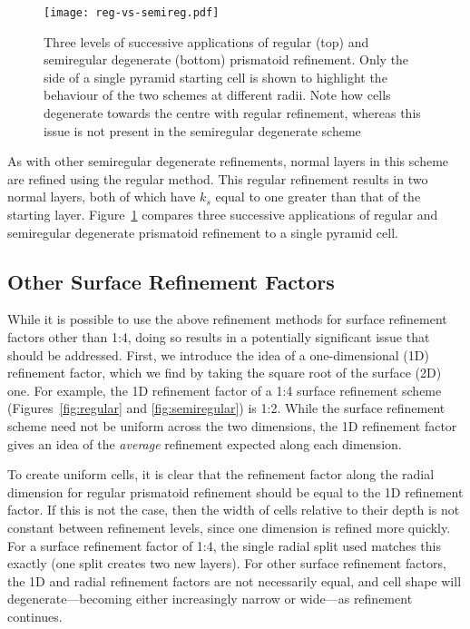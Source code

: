 \begin{figure}[ht!]
	\centering
	\texttt{[image: reg-vs-semireg.pdf]}
	\caption[Comparison of regular and semiregular degenerate prismatoid refinement]{
		Three levels of successive applications of regular (top) and semiregular degenerate (bottom) prismatoid refinement.
		Only the side of a single pyramid starting cell is shown to highlight the behaviour of the two schemes at different radii.
		Note how cells degenerate towards the centre with regular refinement, whereas this issue is not present in the semiregular degenerate scheme
	}
	\label{fig:reg-vs-semireg}
\end{figure}


As with other semiregular degenerate refinements, normal layers in this scheme are refined using the regular method.
This regular refinement results in two normal layers, both of which have $k_s$ equal to one greater than that of the starting layer.
Figure~\ref{fig:reg-vs-semireg} compares three successive applications of regular and semiregular degenerate prismatoid refinement to a single pyramid cell.


\subsection{Other Surface Refinement Factors} \label{chap:5:factors}
While it is possible to use the above refinement methods for surface refinement factors other than 1:4, doing so results in a potentially significant issue that should be addressed.
First, we introduce the idea of a one-dimensional (1D) refinement factor, which we find by taking the square root of the surface (2D) one.
For example, the 1D refinement factor of a 1:4 surface refinement scheme (Figures~\ref{fig:regular} and \ref{fig:semiregular}) is 1:2.
While the surface refinement scheme need not be uniform across the two dimensions, the 1D refinement factor gives an idea of the \textit{average} refinement expected along each dimension.


To create uniform cells, it is clear that the refinement factor along the radial dimension for regular prismatoid refinement should be equal to the 1D refinement factor.
If this is not the case, then the width of cells relative to their depth is not constant between refinement levels, since one dimension is refined more quickly.
For a surface refinement factor of 1:4, the single radial split used matches this exactly (one split creates two new layers).
For other surface refinement factors, the 1D and radial refinement factors are not necessarily equal, and cell shape will degenerate---becoming either increasingly narrow or wide---as refinement continues.


